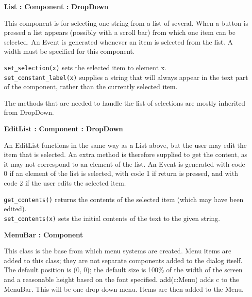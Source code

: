 {\ttfamily\bfseries
{}List : Component : DropDown}

This component is for selecting one string from a list of several. When
a button is pressed a list appears (possibly with a scroll bar) from
which one item can be selected. An Event is generated whenever an item
is selected from the list. A width must be specified for this
component.

\texttt{set\_selection(x)} sets the selected item to element x.\\
\texttt{set\_constant\_label(x)} supplies a string that will always appear in
the text part of the component, rather than the currently selected item.

The methods that are needed to handle the list of selections are mostly
inherited from DropDown. 


{\ttfamily\bfseries
{}EditList : Component : DropDown}

An EditList functions in the same way as a List above, but the user may
edit the item that is selected. An extra method is therefore supplied
to get the content, as it may not correspond to an element of the list.
An Event is generated with code 0 if an element of the list is
selected, with code 1 if return is pressed, and with code 2 if the user
edits the selected item.

\texttt{get\_contents()} returns the contents of the selected item (which may
have been edited).\\
\texttt{set\_contents(x)} sets the initial contents of the text to the given
string.

{\ttfamily\bfseries
{}MenuBar : Component}

This class is the base from which menu systems are created. Menu items
are added to this class; they are not separate components added to the
dialog itself. The default position is (0, 0); the default size is
100\% of the width of the screen and a reasonable height based on the
font specified. add(c:Menu) adds c to the MenuBar. This will be one
drop down menu. Items are then added to the Menu.

